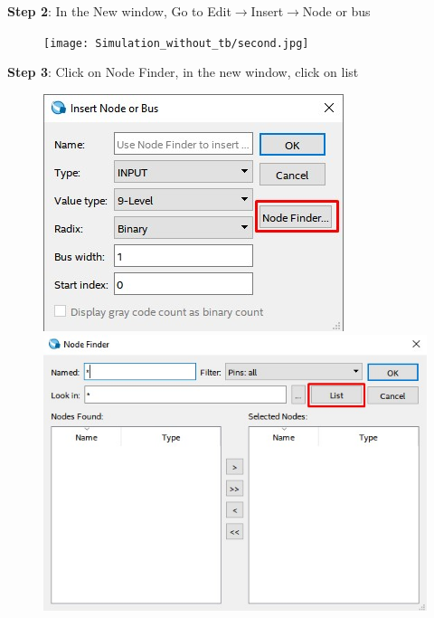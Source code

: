 \documentclass[12pt,singleside,a4paper]{article}
\begin{document}
\noindent \textbf{Step 2}: In the New window, Go to Edit$\rightarrow$Insert$\rightarrow$Node or bus
\begin{figure}[H]
\centering
\texttt{[image: Simulation\_without\_tb/second.jpg]}
\end{figure}

\noindent \textbf{Step 3}: Click on Node Finder, in the new window, click on list
\begin{figure}[H]
\centering
\includegraphics[scale=0.7]{Simulation_without_tb/third.jpg}\includegraphics[scale=0.7]{Simulation_without_tb/third_1.jpg}
\end{figure}
\end{document}
